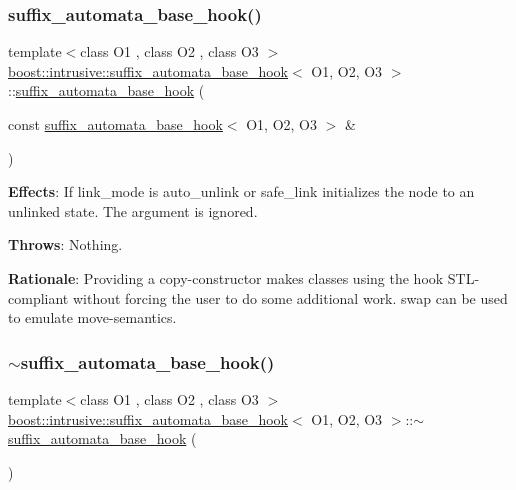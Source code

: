 \subsubsection{\texorpdfstring{suffix\+\_\+automata\+\_\+base\+\_\+hook()}{suffix\_automata\_base\_hook()}\hspace{0.1cm}{\footnotesize\ttfamily [2/2]}}
{\footnotesize\ttfamily template$<$class O1 , class O2 , class O3 $>$ \\
\hyperlink{classboost_1_1intrusive_1_1suffix__automata__base__hook}{boost\+::intrusive\+::suffix\+\_\+automata\+\_\+base\+\_\+hook}$<$ O1, O2, O3 $>$\+::\hyperlink{classboost_1_1intrusive_1_1suffix__automata__base__hook}{suffix\+\_\+automata\+\_\+base\+\_\+hook} (\begin{DoxyParamCaption}\item[{const \hyperlink{classboost_1_1intrusive_1_1suffix__automata__base__hook}{suffix\+\_\+automata\+\_\+base\+\_\+hook}$<$ O1, O2, O3 $>$ \&}]{ }\end{DoxyParamCaption})}

{\bfseries Effects}\+: If link\+\_\+mode is {\ttfamily auto\+\_\+unlink} or {\ttfamily safe\+\_\+link} initializes the node to an unlinked state. The argument is ignored.

{\bfseries Throws}\+: Nothing.

{\bfseries Rationale}\+: Providing a copy-\/constructor makes classes using the hook S\+T\+L-\/compliant without forcing the user to do some additional work. {\ttfamily swap} can be used to emulate move-\/semantics. \mbox{\label{classboost_1_1intrusive_1_1suffix__automata__base__hook_ae5bb92cac33b7648f6b3a152de04c54e}} 
\subsubsection{\texorpdfstring{$\sim$suffix\+\_\+automata\+\_\+base\+\_\+hook()}{~suffix\_automata\_base\_hook()}}
{\footnotesize\ttfamily template$<$class O1 , class O2 , class O3 $>$ \\
\hyperlink{classboost_1_1intrusive_1_1suffix__automata__base__hook}{boost\+::intrusive\+::suffix\+\_\+automata\+\_\+base\+\_\+hook}$<$ O1, O2, O3 $>$\+::$\sim$\hyperlink{classboost_1_1intrusive_1_1suffix__automata__base__hook}{suffix\+\_\+automata\+\_\+base\+\_\+hook} (\begin{DoxyParamCaption}{ }\end{DoxyParamCaption})}

